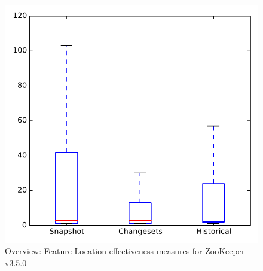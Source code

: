 
\begin{figure}
\centering
\includegraphics[height=0.4\textheight]{figures/flt/all_zookeeper_no_outlier}
\caption{Overview: Feature Location effectiveness measures for ZooKeeper v3.5.0}
\label{fig:flt:all:zookeeper}
\end{figure}
